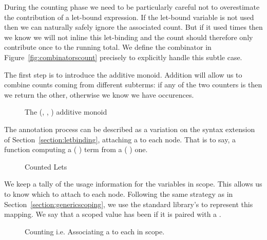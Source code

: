 During the counting phase we need to be particularly careful not to overestimate
the contribution of a let-bound expression. If the let-bound variable is not used
then we can naturally safely ignore the associated count. But if it used 
times then we know we will not inline this let-binding and the count should
therefore only contribute once to the running total. We define the 
combinator in Figure~\ref{fig:combinatorscount} precisely to explicitly handle this
subtle case.

The first step is to introduce the  additive monoid. Addition will
allow us to combine counts coming from different subterms: if any of the two
counters is  then we return the other, otherwise we know we have
 occurences.

\begin{figure}[h]
\begin{minipage}{0.45\textwidth}
\end{minipage}
\begin{minipage}{0.45\textwidth}
\end{minipage}
\caption{The (, , \AF{\_+\_}) additive monoid}
\end{figure}

The annotation process can be described as a variation on the  syntax
extension of Section~\ref{section:letbinding}, attaching a  to
each  node. That is to say, a function computing a
{(  )} term from a {(  )} one.

\begin{figure}[h]
\caption{Counted Lets}
\end{figure}

We keep a tally of the usage information for the variables in scope. This
allows us to know which  to attach to each  node.
Following the same strategy as in Section~\ref{section:genericscoping},
we use the standard library's  to represent this mapping. We say
that a scoped value has been  if it is paired with a .

\begin{figure}[h]
\begin{minipage}{0.45\textwidth}
\end{minipage}
\begin{minipage}{0.45\textwidth}
\end{minipage}
\caption{Counting i.e. Associating a  to each  in scope.}
\end{figure}

